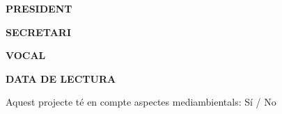 \begin{titlepage}
\begin{center}
{\begin{tcolorbox}
                \begin{minipage}[t]{0.33\textwidth}
                    \centering\textbf{PRESIDENT}
                \end{minipage}
                \begin{minipage}[t]{0.33\textwidth}
                    \centering\textbf{SECRETARI}
                \end{minipage}%
                \begin{minipage}[t]{0.33\textwidth}
                    \centering\textbf{VOCAL}
                \end{minipage}%

                \vspace{2cm}
                \centering
                \textbf{DATA DE LECTURA}
                \vspace{1.25cm}
            \end{tcolorbox}
        }

        \vspace{0.75cm}
        Aquest projecte té en compte aspectes mediambientals: Sí / No

    \end{center}
\end{titlepage}
